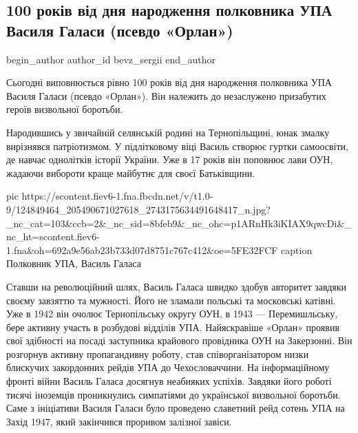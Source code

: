  
 
 
 
 
 
\subsection{100 років від дня народження полковника УПА Василя Галаси (псевдо «Орлан»)}
\label{sec:12_11_2020.fb.bevz_sergii.1.100_rokiv_upa_vasyl_galasa}
\ifcmt
	begin_author
   author_id bevz_sergii
	end_author
\fi
{}

Сьогодні виповнюється рівно 100 років від дня народження полковника УПА Василя
Галаси (псевдо «Орлан»). Він належить до незаслужено призабутих героїв
визвольної боротьби. 

Народившись у звичайній селянській родині на Тернопільщині, юнак змалку
вирізнявся патріотизмом. У підлітковому віці Василь створює гуртки самоосвіти,
де навчає однолітків історії України. Уже в 17 років він поповнює лави ОУН,
жадаючи вибороти краще майбутнє для своєї Батьківщини. 

\ifcmt
pic https://scontent.fiev6-1.fna.fbcdn.net/v/t1.0-9/124849464_205490671027618_2743175634491648417_n.jpg?_nc_cat=103&ccb=2&_nc_sid=8bfeb9&_nc_ohc=p1ARnHk3iKIAX9qwcDi&_nc_ht=scontent.fiev6-1.fna&oh=692a9e56ab23b733d07d8751c767c412&oe=5FE32FCF
caption Полковник УПА, Василь Галаса
\fi

Ставши на революційний шлях, Василь Галаса швидко здобув авторитет завдяки
своєму завзяттю та мужності. Його не зламали польські та московські катівні.
Уже в 1942 він очолює Тернопільську округу ОУН, в 1943 --- Перемишльську, бере
активну участь в розбудові відділів УПА. Найяскравіше «Орлан» проявив свої
здібності на посаді заступника крайового провідника ОУН на Закерзонні. Він
розгорнув активну пропагандивну роботу, став співорганізатором низки блискучих
закордонних рейдів УПА до Чехословаччини. На інформаційному фронті війни Василь
Галаса досягнув неабияких успіхів. Завдяки його роботі тисячі іноземців
проникнулись симпатіями до української визвольної боротьби. Саме з  ініціативи
Василя Галаси було проведено славетний рейд сотень УПА на Захід 1947, який
закінчився проривом залізної завіси. 

